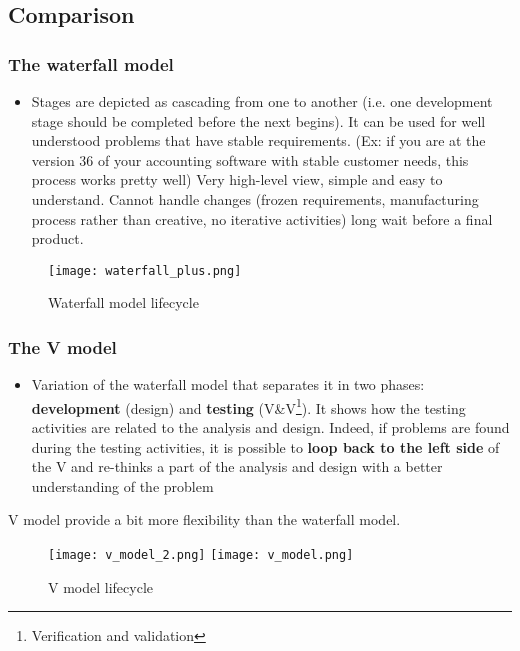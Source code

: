 \subsection{Comparison}

\subsubsection{The waterfall model} 
\begin{itemize}
    \item Stages are depicted as cascading from one to another (i.e. one
        development stage should be completed before the next begins). 
        \proitem{} It can be
        used for well understood problems that have stable requirements. (Ex: if
        you are at the version 36 of your accounting software with stable
        customer needs, this process works pretty well)
        \proitem{} Very high-level view, simple and easy to understand.
        \consitem Cannot handle changes (frozen requirements, manufacturing
        process rather than creative, no iterative activities) 
        \consitem long wait before a final product.
\end{itemize}

\begin{figure}[!ht]
    \centering
    \texttt{[image: waterfall\_plus.png]}
    \caption{Waterfall model lifecycle}
\end{figure}
\FloatBarrier{}

\subsubsection{The V model}

\begin{itemize}
        \item Variation of the waterfall model that separates it in
two phases: \textbf{development} (design) and \textbf{testing}
(V\&V\footnote{Verification and validation}).
\proitem{} It shows how the testing activities are related to the analysis and
design. Indeed, if problems are found during the testing activities, it
is possible to \textbf{loop back to the left side} of the V and re-thinks a part
of the analysis and design with a better understanding of the problem
\end{itemize}

V model provide a bit more flexibility than the waterfall model.

\begin{figure}[!ht]
    \centering
    \texttt{[image: v\_model\_2.png]}
    \texttt{[image: v\_model.png]}
    \caption{V model lifecycle}
\end{figure}
\FloatBarrier{}

